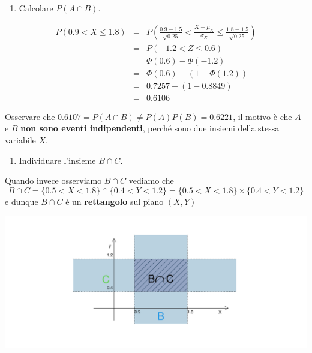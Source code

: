 \documentclass[
  11pt,
]{book}
\providecommand{\tightlist}{%
  \setlength{\itemsep}{0pt}\setlength{\parskip}{0pt}}
\theoremstyle{mytheoremstyle}
\theoremstyle{mydefstyle}
\begin{document}
\begin{enumerate}
\def\labelenumi{\arabic{enumi}.}
\setcounter{enumi}{4}
\tightlist
\item
  Calcolare \(P(A\cap B)\).
\end{enumerate}

\begin{eqnarray*}
   P( 0.9 < X \leq  1.8 ) &=& P\left( \frac { 0.9  -  1.5 }{\sqrt{ 0.25 }} < \frac { X  -  \mu_X }{ \sigma_X } \leq \frac { 1.8  -  1.5 }{\sqrt{ 0.25 }}\right)  \\
              &=& P\left(  -1.2  < Z \leq  0.6 \right) \\
              &=& \Phi( 0.6 )-\Phi( -1.2 )\\
              &=&  \Phi( 0.6 )-(1-\Phi( 1.2 )) \\ &=&  0.7257 -(1- 0.8849 ) \\ 
              &=&  0.6106 
   \end{eqnarray*}

Osservare che \(0.6107=P(A\cap B)\neq P(A)P(B)=0.6221\), il motivo è che \(A\) e \(B\) \textbf{non sono eventi indipendenti}, perché sono due insiemi della stessa variabile \(X\).

\begin{enumerate}
\def\labelenumi{\arabic{enumi}.}
\setcounter{enumi}{5}
\tightlist
\item
  Individuare l'insieme \(B\cap C\).
\end{enumerate}

Quando invece osserviamo \(B\cap C\) vediamo che
\[B\cap C=\{0.5<X<1.8\}\cap\{0.4<Y< 1.2\}= \{0.5<X<1.8\}\times\{0.4<Y< 1.2\} \]
e dunque \(B\cap C\) è un \textbf{rettangolo} sul piano \((X,Y)\)

\begin{center}\includegraphics{Appunti_di_Statistica_2025_files/figure-latex/07d-Esercizi-Normale-7-1} \end{center}
\end{document}
